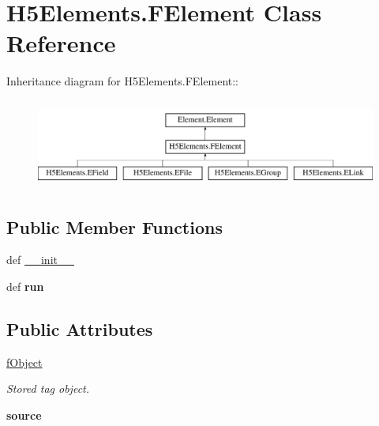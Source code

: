 \hypertarget{classH5Elements_1_1FElement}{
\section{H5Elements.FElement Class Reference}
\label{classH5Elements_1_1FElement}
}
Inheritance diagram for H5Elements.FElement::\begin{figure}[H]
\begin{center}
\leavevmode
\includegraphics[height=2.95775cm]{classH5Elements_1_1FElement}
\end{center}
\end{figure}
\subsection*{Public Member Functions}
\begin{DoxyCompactItemize}
\item 
def \hyperlink{classH5Elements_1_1FElement_ac013d152339bec50771f059a62e764c7}{\_\-\_\-init\_\-\_\-}
\item 
\hypertarget{classH5Elements_1_1FElement_ab857523cc7673e38615eca1c808d6663}{
def {\bfseries run}}
\label{classH5Elements_1_1FElement_ab857523cc7673e38615eca1c808d6663}

\end{DoxyCompactItemize}
\subsection*{Public Attributes}
\begin{DoxyCompactItemize}
\item 
\hypertarget{classH5Elements_1_1FElement_a09a6294d06d1bdaf337218bc9db31309}{
\hyperlink{classH5Elements_1_1FElement_a09a6294d06d1bdaf337218bc9db31309}{fObject}}
\label{classH5Elements_1_1FElement_a09a6294d06d1bdaf337218bc9db31309}

\begin{DoxyCompactList}\small\item\em Stored tag object. \item\end{DoxyCompactList}\item 
\hypertarget{classH5Elements_1_1FElement_afa877c4dd573134f9483a9a35deedda7}{
{\bfseries source}}
\label{classH5Elements_1_1FElement_afa877c4dd573134f9483a9a35deedda7}

\end{DoxyCompactItemize}


